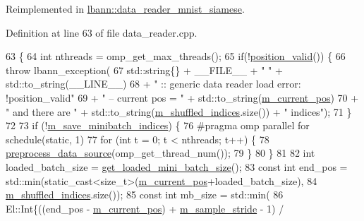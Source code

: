 Reimplemented in \hyperlink{classlbann_1_1data__reader__mnist__siamese_ac44a7118e94338e14f7b6a9e33239155}{lbann\+::data\+\_\+reader\+\_\+mnist\+\_\+siamese}.



Definition at line 63 of file data\+\_\+reader.\+cpp.


\begin{DoxyCode}
63                                                \{
64   \textcolor{keywordtype}{int} nthreads = omp\_get\_max\_threads();
65   \textcolor{keywordflow}{if}(!\hyperlink{classlbann_1_1generic__data__reader_a2b10538440d784f0f12582a5407acef2}{position\_valid}()) \{
66     \textcolor{keywordflow}{throw} lbann\_exception(
67       std::string\{\} + \_\_FILE\_\_ + \textcolor{stringliteral}{" "} + std::to\_string(\_\_LINE\_\_)
68       + \textcolor{stringliteral}{" :: generic data reader load error: !position\_valid"}
69       + \textcolor{stringliteral}{" -- current pos = "} + std::to\_string(\hyperlink{classlbann_1_1generic__data__reader_a2facf4e410099ac8c1fa586e797ec2e0}{m\_current\_pos})
70       + \textcolor{stringliteral}{" and there are "} + std::to\_string(\hyperlink{classlbann_1_1generic__data__reader_aaab6aeff67ffff1c689336851fec2c57}{m\_shuffled\_indices}.size()) + \textcolor{stringliteral}{" indices"});
71   \}
72 
73   \textcolor{keywordflow}{if} (!\hyperlink{classlbann_1_1generic__data__reader_ab1d7cac44072bd1f67291c6169414112}{m\_save\_minibatch\_indices}) \{
76 \textcolor{preprocessor}{    #pragma omp parallel for schedule(static, 1)}
77     \textcolor{keywordflow}{for} (\textcolor{keywordtype}{int} t = 0; t < nthreads; t++) \{
78       \hyperlink{classlbann_1_1generic__data__reader_ad613f95666b973d8da77773fb34c9b66}{preprocess\_data\_source}(omp\_get\_thread\_num());
79     \}
80   \}
81 
82   \textcolor{keywordtype}{int} loaded\_batch\_size = \hyperlink{classlbann_1_1generic__data__reader_a850e99110dd1e9df2985f09ea196fea8}{get\_loaded\_mini\_batch\_size}();
83   \textcolor{keyword}{const} \textcolor{keywordtype}{int} end\_pos = std::min(static\_cast<size\_t>(\hyperlink{classlbann_1_1generic__data__reader_a2facf4e410099ac8c1fa586e797ec2e0}{m\_current\_pos}+loaded\_batch\_size),
84                                \hyperlink{classlbann_1_1generic__data__reader_aaab6aeff67ffff1c689336851fec2c57}{m\_shuffled\_indices}.size());
85   \textcolor{keyword}{const} \textcolor{keywordtype}{int} mb\_size = std::min(
86     El::Int\{((end\_pos - \hyperlink{classlbann_1_1generic__data__reader_a2facf4e410099ac8c1fa586e797ec2e0}{m\_current\_pos}) + \hyperlink{classlbann_1_1generic__data__reader_a58461c39de7e17eafc5b98aec99cbb9b}{m\_sample\_stride} - 1) / 

\end{DoxyCode}
